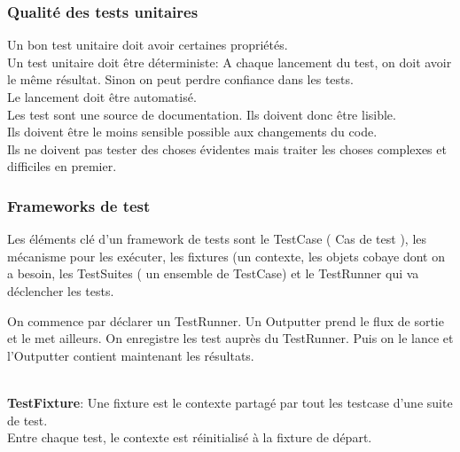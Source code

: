 \subsubsection{Qualité des tests unitaires}
	Un bon test unitaire doit avoir certaines propriétés.
	\\Un test unitaire doit être déterministe: A chaque lancement du test, on doit avoir le même résultat. Sinon on peut perdre confiance dans les tests.
	\\Le lancement doit être automatisé.
	\\Les test sont une source de documentation. Ils doivent donc être lisible.
	\\Ils doivent être le moins sensible possible aux changements du code.
	\\Ils ne doivent pas tester des choses évidentes mais traiter les choses complexes et difficiles en premier.


\subsubsection{Frameworks de test}
	Les éléments clé d’un framework de tests sont le TestCase ( Cas de test ), les mécanisme pour les exécuter, les fixtures (un contexte, les objets cobaye dont on a besoin, les TestSuites ( un ensemble de TestCase) et le TestRunner qui va déclencher les tests.

	On commence par déclarer un TestRunner. Un Outputter prend le flux de sortie et le met ailleurs. On enregistre les test auprès du TestRunner. Puis on le lance et l’Outputter contient maintenant les résultats.

	\\\textbf{TestFixture}: Une fixture est le contexte partagé par tout les testcase d’une suite de test.
	\\Entre chaque test, le contexte est réinitialisé à la fixture de départ.